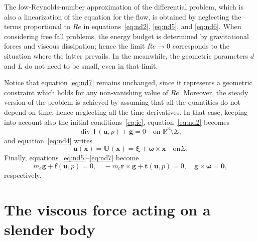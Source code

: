 \documentclass[final]{amsart}
\theoremstyle{definition}
\theoremstyle{definition}
\theoremstyle{remark}
\begin{document}
The low-Reynolds-number approximation of the differential problem,
which is also a linearization of the equation for the flow, is
obtained by neglecting the terms proportional to ${\mathit{Re}}$ in
equations~\eqref{eq:nd2}, \eqref{eq:nd5}, and \eqref{eq:nd6}. When
considering free fall problems, the energy budget is determined by
gravitational forces and viscous dissipation; hence the limit ${\mathit{Re}}\to
0$ corresponds to the situation where the latter prevails. In the
meanwhile, the geometric parameters $d$ and $L$ do not need to be small,
even in that limit.

Notice that equation \eqref{eq:nd7} remains unchanged, since it
represents a geometric constraint which holds for any non-vanishing
value of ${\mathit{Re}}$. Moreover, the steady version of the problem is
achieved by assuming that all the quantities do not depend on time,
hence neglecting all the time derivatives. In that case, keeping into
account also the initial conditions~\eqref{eq:ic},
equation~\eqref{eq:nd2} becomes
\begin{equation}\label{eq:motion}
{\operatorname{\mathrm{div}}}{\mathsf T}({\boldsymbol u},p)+{\boldsymbol g}=0\quad\text{on ${\mathbb R}^3\setminus{\Sigma}$},
\end{equation}
and equation~\eqref{eq:nd4} writes
\[
{\boldsymbol u}({\boldsymbol x})={\boldsymbol U}({\boldsymbol x}) = {\boldsymbol \xi}+{\boldsymbol \omega}\times{\boldsymbol x}\quad\text{on
}{\Sigma}.
\]
Finally, equations~\eqref{eq:nd5}--\eqref{eq:nd7} become
\[
m_e{\boldsymbol g}+{\boldsymbol f}({\boldsymbol u},p)=0,\quad -m_c{\boldsymbol r}\times{\boldsymbol g}+{\boldsymbol t}({\boldsymbol u},p)=0,
\quad {\boldsymbol g}\times{\boldsymbol \omega}={\boldsymbol 0},
\]
respectively.

\section{The viscous force acting on a slender
  body}\label{sec:drhr}
\end{document}
